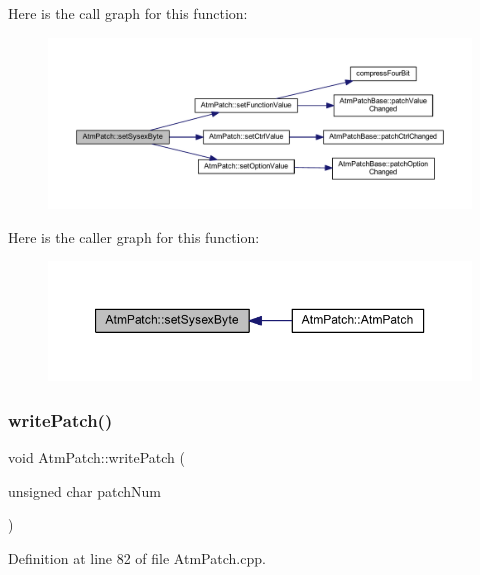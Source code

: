 Here is the call graph for this function\+:
\nopagebreak
\begin{figure}[H]
\begin{center}
\leavevmode
\includegraphics[width=350pt]{class_atm_patch_acc2729c3b10aa4d7f98e67caa3b80255_cgraph}
\end{center}
\end{figure}
Here is the caller graph for this function\+:
\nopagebreak
\begin{figure}[H]
\begin{center}
\leavevmode
\includegraphics[width=350pt]{class_atm_patch_acc2729c3b10aa4d7f98e67caa3b80255_icgraph}
\end{center}
\end{figure}
\mbox{\label{class_atm_patch_a5814cd528970cb153dd67865a6b86c85}} 
\subsubsection{\texorpdfstring{write\+Patch()}{writePatch()}}
{\footnotesize\ttfamily void Atm\+Patch\+::write\+Patch (\begin{DoxyParamCaption}\item[{unsigned char}]{patch\+Num }\end{DoxyParamCaption})}



Definition at line 82 of file Atm\+Patch.\+cpp.

